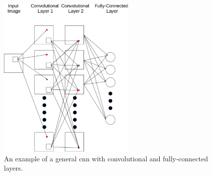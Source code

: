 \begin{figure}[H]
  \centering
    \includegraphics[width=0.6\textwidth]{Figs/Techanal/cnnarch.pdf}
      \caption{An example of a general \gls{cnn} with convolutional and fully-connected layers.}
    \label{fig:generalcnn}
\end{figure}

